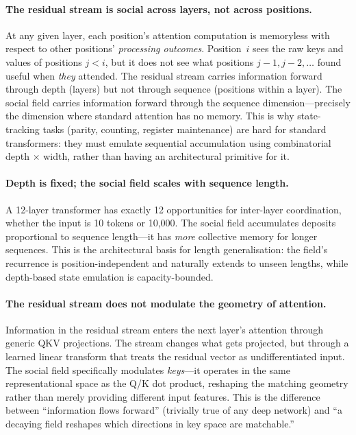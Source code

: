 \documentclass[11pt,a4paper]{article}
\begin{document}
\paragraph{The residual stream is social across layers, not across
positions.}
At any given layer, each position's attention computation is memoryless
with respect to other positions' \emph{processing outcomes}.
Position~$i$ sees the raw keys and values of positions $j < i$, but it
does not see what positions $j\!-\!1, j\!-\!2, \ldots$ found useful
when \emph{they} attended.  The residual stream carries information
forward through depth (layers) but not through sequence (positions
within a layer).  The social field carries information forward through
the sequence dimension---precisely the dimension where standard
attention has no memory.  This is why state-tracking tasks (parity,
counting, register maintenance) are hard for standard transformers:
they must emulate sequential accumulation using combinatorial
depth$\,\times\,$width, rather than having an architectural primitive
for it.

\paragraph{Depth is fixed; the social field scales with sequence
length.}
A 12-layer transformer has exactly 12 opportunities for inter-layer
coordination, whether the input is 10 tokens or 10{,}000.  The social
field accumulates deposits proportional to sequence length---it has
\emph{more} collective memory for longer sequences.  This is the
architectural basis for length generalisation: the field's recurrence
is position-independent and naturally extends to unseen lengths, while
depth-based state emulation is capacity-bounded.

\paragraph{The residual stream does not modulate the geometry of
attention.}
Information in the residual stream enters the next layer's attention
through generic QKV projections.  The stream changes what gets
projected, but through a learned linear transform that treats the
residual vector as undifferentiated input.  The social field
specifically modulates \emph{keys}---it operates in the same
representational space as the Q/K dot product, reshaping the matching
geometry rather than merely providing different input features.  This
is the difference between ``information flows forward'' (trivially true
of any deep network) and ``a decaying field reshapes which directions
in key space are matchable.''
\end{document}
